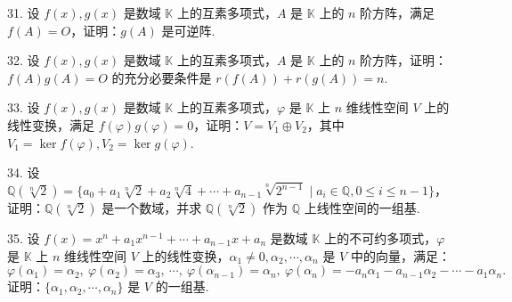 \documentclass[UTF8, 12pt, fontset=fandol, oneside]{ctexart}
\begin{document}
31. 设 $f(x),g(x)$ 是数域 $\mathbb{K}$ 上的互素多项式，$A$ 是 $\mathbb{K}$ 上的 $n$ 阶方阵，满足 $f(A)=O$，证明：$g(A)$ 是可逆阵.

32. 设 $f(x),g(x)$ 是数域 $\mathbb{K}$ 上的互素多项式，$A$ 是 $\mathbb{K}$ 上的 $n$ 阶方阵，证明：$f(A)g(A)=O$ 的充分必要条件是 $r(f(A))+r(g(A))=n$.

33. 设 $f(x),g(x)$ 是数域 $\mathbb{K}$ 上的互素多项式，$\varphi$ 是 $\mathbb{K}$ 上 $n$ 维线性空间 $V$ 上的线性变换，满足 $f(\varphi)g(\varphi)=0$，证明：$V=V_1\oplus V_2$，其中 $V_1=\ker f(\varphi),V_2=\ker g(\varphi)$.

34. 设 $\mathbb{Q}(\sqrt[n]{2})=\{a_0+a_1\sqrt[n]{2}+a_2\sqrt[n]{4}+\cdots+a_{n-1}\sqrt[n]{2^{n-1}}\mid a_i\in\mathbb{Q},0\leq i\leq n-1\}$，证明：$\mathbb{Q}(\sqrt[n]{2})$ 是一个数域，并求 $\mathbb{Q}(\sqrt[n]{2})$ 作为 $\mathbb{Q}$ 上线性空间的一组基.

35. 设 $f(x)=x^n+a_1x^{n-1}+\cdots+a_{n-1}x+a_n$ 是数域 $\mathbb{K}$ 上的不可约多项式，$\varphi$ 是 $\mathbb{K}$ 上 $n$ 维线性空间 $V$ 上的线性变换，$\alpha_1\neq 0,\alpha_2,\cdots,\alpha_n$ 是 $V$ 中的向量，满足：
\[
\varphi(\alpha_1)=\alpha_2,\ \varphi(\alpha_2)=\alpha_3,\ \cdots,\ \varphi(\alpha_{n-1})=\alpha_n,\ \varphi(\alpha_n)=-a_n\alpha_1-a_{n-1}\alpha_2-\cdots-a_1\alpha_n.
\]
证明：$\{\alpha_1,\alpha_2,\cdots,\alpha_n\}$ 是 $V$ 的一组基.
\end{document}
